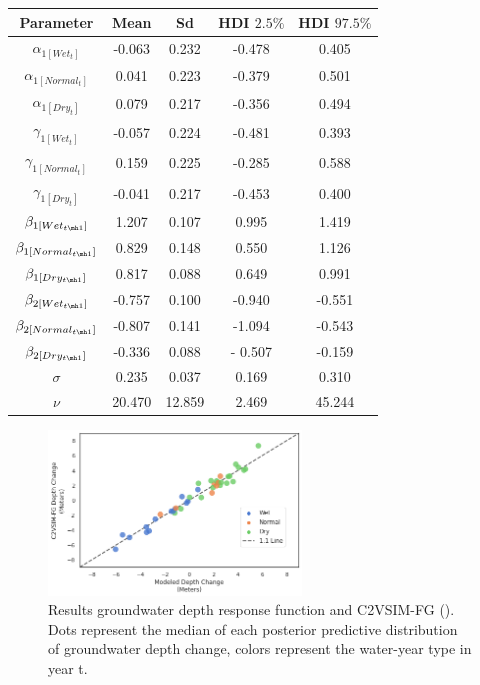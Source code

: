 \documentclass[11pt,a4paper]{article}
\begin{document}
\begin{center}
\begin{tabular}{ |c|c|c|c|c| }
 \hline
 Parameter & Mean & Sd & HDI $2.5\%$ & HDI $97.5\%$ \\ 
 \hline
$\alpha_{1[Wet_{t}]}$ & 	-0.063 &	0.232 &	-0.478 &	0.405 		 \\
$\alpha_{1[Normal_{t}]}$ & 0.041 &	0.223 &	-0.379 &	0.501 	 \\
$\alpha_{1[Dry_{t}]}$ & 	 0.079 &	0.217 &	-0.356 &	0.494	 \\
$\gamma_{1[Wet_{t}]}$ & 	-0.057 	& 0.224 &	-0.481 &	0.393 	 \\
$\gamma_{1[Normal_{t}]}$ & 0.159 &	0.225 &	-0.285 &	0.588 \\
$\gamma_{1[Dry_{t}]}$ & -0.041 &	0.217 &	-0.453 &	0.400 	 \\
$\beta_{1[Wet_{t \mh 1}]}$ & 1.207 &	0.107 &	0.995 &	1.419 	 \\
$\beta_{1[Normal_{t \mh 1}]}$ 	& 0.829 &	0.148 &	0.550 &	1.126	\\
$\beta_{1[Dry_{t \mh 1}]}$ & 0.817 &	0.088 &	0.649 &	0.991 \\
$\beta_{2[Wet_{t \mh 1}]}$ & -0.757 	& 0.100 & -0.940 & 	-0.551 	 \\
$\beta_{2[Normal_{t \mh 1}]}$ & -0.807 &	0.141 &	-1.094 & -0.543 	\\
$\beta_{2[Dry_{t \mh 1}]}$ & -0.336 	& 0.088 & 	- 0.507 &  -0.159 \\
$\sigma$ & 0.235 & 	0.037 & 0.169 & 	0.310 \\
$\nu$ 	& 20.470 & 	12.859 & 2.469 &  	45.244 \\
\hline
\end{tabular}
\end{center}

\begin{figure}[H]
    \centering
    \includegraphics[width=0.6\textwidth]{results_gw_depth_response_calib.png}
    \caption{Results groundwater depth response function and C2VSIM-FG (\cite{dwr_c2vsimfg_2021}). Dots represent the median of each posterior predictive distribution of groundwater depth change, colors represent the water-year type in year t.}
    \label{fig:mesh1}
\end{figure}
\end{document}
